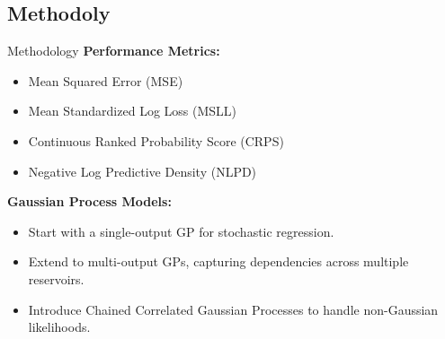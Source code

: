 \subsection{Methodoly}
\begin{frame}{Methodology}
	\textbf{Performance Metrics:}
	\begin{itemize}
		\item Mean Squared Error (MSE)
		\item Mean Standardized Log Loss (MSLL)
		\item Continuous Ranked Probability Score (CRPS)
		\item Negative Log Predictive Density (NLPD)
	\end{itemize}
	
	\textbf{Gaussian Process Models:}
	\begin{itemize}
		\item Start with a single-output GP for stochastic regression.
		\item Extend to multi-output GPs, capturing dependencies across multiple reservoirs.
		\item Introduce Chained Correlated Gaussian Processes to handle non-Gaussian likelihoods.
	\end{itemize}
\end{frame}

